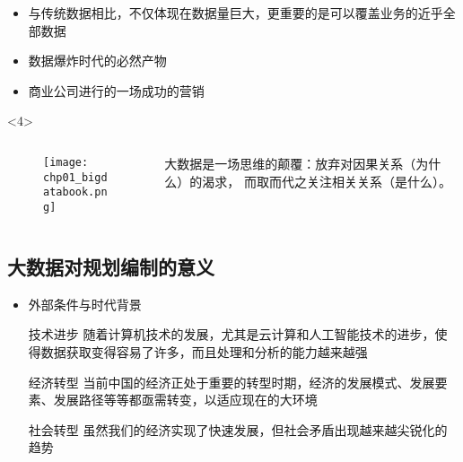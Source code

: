 \begin{frame}[t]{\subsecname}
\begin{itemize}
\item<1-> 与传统数据相比，不仅体现在数据量巨大，更重要的是可以覆盖业务的近乎全部数据
\item<2-> 数据爆炸时代的必然产物
\item<3-> 商业公司进行的一场成功的营销 
\end{itemize}

\begin{overlayarea}{\textwidth}{\textheight}
  \begin{onlyenv}<4>
     \begin{columns}
       \begin{column}{.3\textwidth}
       \begin{figure}
         \centering \texttt{[image: chp01\_bigdatabook.png]}
       \end{figure}
       \end{column}
       \begin{column}{.7\textwidth}
      \begin{ornamentblock}
          \hspace*{2em}大数据是一场思维的颠覆：放弃对因果关系（为什么）的渴求，
而取而代之关注相关关系（是什么）。\\
      \end{ornamentblock}
       \end{column}
     \end{columns}
  \end{onlyenv}
\end{overlayarea}
\end{frame}

\subsection{大数据对规划编制的意义}

\begin{frame}[t]{\subsecname}
\begin{itemize}
\item<1-> 外部条件与时代背景
\pause
\begin{commonbox}{技术进步} 
随着计算机技术的发展，尤其是云计算和人工智能技术的进步，使得数据获取变得容易了许多，而且处理和分析的能力越来越强
\end{commonbox}
\pause 
\begin{commonbox}{经济转型} 
当前中国的经济正处于重要的转型时期，经济的发展模式、发展要素、发展路径等等都亟需转变，以适应现在的大环境
\end{commonbox}
\pause
\begin{commonbox}{社会转型} 
虽然我们的经济实现了快速发展，但社会矛盾出现越来越尖锐化的趋势
\end{commonbox}
\end{itemize}
\end{frame}


